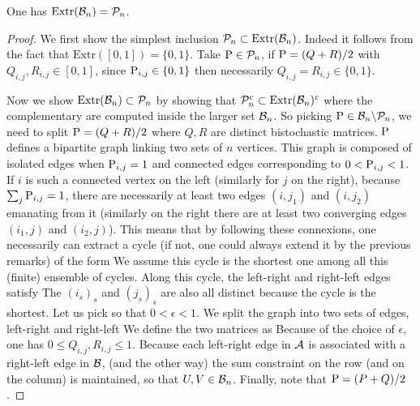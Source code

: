 \begin{thm}\label{thm-birkh-vnm}
	One has $\text{Extr}(\Bb_n) = \Pp_n$.
\end{thm}
\begin{proof}
	We first show the simplest inclusion $\Pp_n \subset \text{Extr}(\Bb_n)$. Indeed it follows from the fact that $\text{Extr}([0,1]) = \{0,1\}$. Take $\P \in \Pp_n$, if $\P=(Q+R)/2$ with $Q_{i,j},R_{i,j} \in [0,1]$, since $\P_{i,j} \in \{0,1\}$ then necessarily $Q_{i,j}=R_{i,j} \in \{0,1\}$.
	
	Now we show $\text{Extr}(\Bb_n) \subset \Pp_n$ by showing that $\Pp_n^c \subset \text{Extr}(\Bb_n)^c$ where the complementary are computed inside the larger set $\Bb_n$. So picking $\P \in \Bb_n \backslash \Pp_n$, we need to split $\P = (Q+R)/2$ where $Q,R$ are distinct bistochastic matrices. 
	$\P$ defines a bipartite graph linking two sets of $n$ vertices. 
	This graph is composed of isolated edges when $\P_{i,j}=1$ and connected edges corresponding to $0 < \P_{i,j} <1$.
	If $i$ is such a connected vertex on the left (similarly for $j$ on the right), because $\sum_j \P_{i,j}=1$, there are necessarily at least two edges $(i,j_1)$ and $(i,j_2)$ emanating from it (similarly on the right there are at least two converging edges $(i_1,j)$ and $(i_2,j)$). This means that by following these connexions, one necessarily can extract a cycle (if not, one could always extend it by the previous remarks) of the form
	We assume this cycle is the shortest one among all this (finite) ensemble of cycles. Along this cycle, the left-right and right-left edges satisfy
	The $(i_s)_s$ and $(j_s)_s$ are also all distinct because the cycle is the shortest. Let us pick
	so that $0 < \epsilon < 1$. 
	We split the graph into two sets of edges, left-right and right-left
	We define the two matrices as
	Because of the choice of $\epsilon$, one has $0 \leq Q_{i,j}, R_{i,j} \leq 1$.
	Because each left-right edge in $\Aa$ is associated with a right-left edge in $\Bb$, (and the other way) the
	sum constraint on the row (and on the column) is maintained, so that $U,V \in \Bb_n$. Finally, note that $\P=(P+Q)/2$.	
\end{proof}


